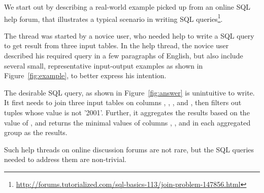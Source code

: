We start out by describing a real-world example picked up from
an online SQL help forum, that illustrates a typical scenario
in writing SQL queries\footnote{\url{http://forums.tutorialized.com/sql-basics-113/join-problem-147856.html}}.

The thread was started by a novice user, who needed help to write a
SQL query to get result from three input tables. In the help thread, the
novice user described his required query in a few paragraphs of
English, but also include several small, representative input-output
examples as shown in Figure~\ref{fig:example}, to better express
his intention. 

The desirable SQL query, as shown in Figure~\ref{fig:answer} is
unintuitive to write. It first needs to join three input tables
on columns , ,
, and ,
then filters out tuples whose  value
is not '2001'. Further, it aggregates the results based on
the value of , and returns the minimal
values of columns , , and 
in each aggregated group as the results.

Such help threads on online discussion forums are not rare, but the SQL
queries needed to address them are non-trivial.

